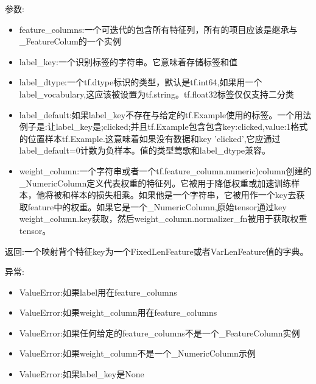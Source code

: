 参数:
\begin{itemize}
	\item feature\_columns:一个可迭代的包含所有特征列，所有的项目应该是继承与\_FeatureColum的一个实例
	\item label\_key:一个识别标签的字符串。它意味着存储标签和值
	\item label\_dtype:一个tf.dtype标识的类型，默认是tf.int64,如果用一个label\_vocabulary,这应该被设置为tf.string。tf.float32标签仅仅支持二分类
	\item label\_default:如果label\_key不存在与给定的tf.Example使用的标签。一个用法例子是:让label\_key是;clicked;并且tf.Example包含包含key:clicked,value:1格式的位置样本tf.Example.这意味着如果没有数据和key 'clicked',它应通过label\_default=0计数为负样本。值的类型莺歌和label\_dtype兼容。
	\item weight\_column:一个字符串或者一个tf.feature\_column.numeric)column创建的\_NumericColumn定义代表权重的特征列。它被用于降低权重或加速训练样本，他将被和样本的损失相乘。如果他是一个字符串，它被用作一个key去获取feature中的权重。如果它是一个\_NumericColumn,原始tensor通过key weight\_column.key获取，然后weight\_column.normalizer\_fn被用于获取权重tensor。
\end{itemize}
返回:一个映射背个特征key为一个FixedLenFeature或者VarLenFeature值的字典。

异常:
\begin{itemize}
	\item ValueError:如果label用在feature\_columns
	\item ValueError:如果weight\_column用在feature\_columns
	\item ValueError:如果任何给定的feature\_columns不是一个\_FeatureColumn实例
	\item ValueError:如果weight\_column不是一个\_NumericColumn示例
	\item ValueError:如果label\_key是None
\end{itemize}
